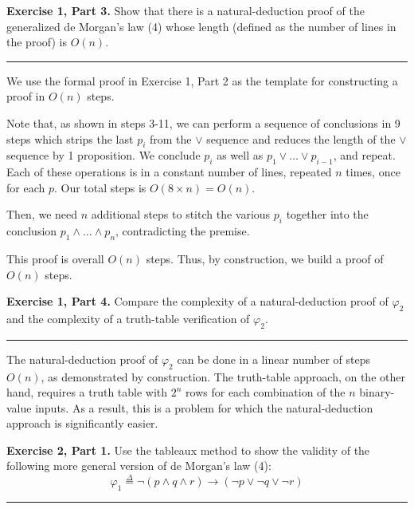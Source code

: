 \documentclass{article}
\newcommand*{\Break}{\vspace{0.2cm}\hrule{}\vspace{0.2cm}}
\begin{document}
\newpage{}

\noindent\textbf{Exercise 1, Part 3.} Show that there is a natural-deduction
proof of the generalized de Morgan's law (4) whose length (defined as the
number of lines in the proof) is $O(n)$.

\Break{}

We use the formal proof in Exercise 1, Part 2 as the template for constructing
a proof in $O(n)$ steps.

Note that, as shown in steps 3-11, we can perform a sequence of conclusions in
9 steps which strips the last $p_i$ from the $\vee$ sequence and reduces the
length of the $\vee$ sequence by 1 proposition. We conclude $p_i$ as well as
$p_1 \vee \dots \vee p_{i-1}$, and repeat. Each of these operations is in
a constant number of lines, repeated $n$ times, once for each $p$. Our total
steps is $O(8 \times n) = O(n)$.

Then, we need $n$ additional steps to stitch the various $p_i$ together into
the conclusion $p_1 \wedge \dots \wedge p_n$, contradicting the premise.

This proof is overall $O(n)$ steps. Thus, by construction, we build a proof of
$O(n)$ steps.

\newpage{}

\noindent\textbf{Exercise 1, Part 4.} Compare the complexity of
a natural-deduction proof of $\varphi_2$ and the complexity of a truth-table
verification of $\varphi_2$.

\Break{}

The natural-deduction proof of $\varphi_2$ can be done in a linear number of
steps $O(n)$, as demonstrated by construction. The truth-table approach, on the
other hand, requires a truth table with $2^n$ rows for each combination of the
$n$ binary-value inputs. As a result, this is a problem for which the
natural-deduction approach is significantly easier.

\newpage{}

\noindent\textbf{Exercise 2, Part 1.} Use the tableaux method to show the
validity of the following more general version of de Morgan's law (4):
\[
  \varphi_1 \overset{\Delta}{=} \lnot (p \wedge q \wedge r) \to (\lnot p \vee \lnot q \vee \lnot r)
\]

\Break{}
\end{document}
